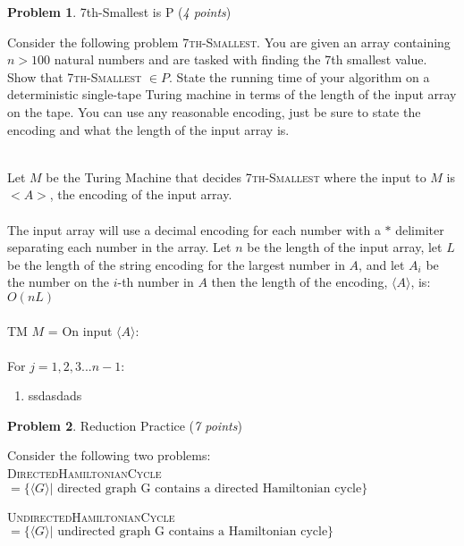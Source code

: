 \documentclass[11pt]{article}
\theoremstyle{definition}
\theoremstyle{theorem}
\newtheorem{prob}{Problem}
\newcommand{\solution}{\medskip\noindent{\color{blue}\textbf{Solution:}}}
\begin{document}
\newpage

\begin{prob} 7th-Smallest is P (\emph{4 points})\end{prob}

Consider the following problem \textsc{7th-Smallest}. You are given an array containing $n>100$ natural numbers and are tasked with finding the 7th smallest value. Show that \textsc{7th-Smallest} $\in P$. State the running time of your algorithm on a deterministic single-tape Turing machine in terms of the length of the input array on the tape. You can use any reasonable encoding, just be sure to state the encoding and what the length of the input array is.

\solution\\
Let $M$ be the Turing Machine that decides \textsc{7th-Smallest} where the input to $M$ is $<A>$, the encoding of the input array. \\~\\
The input array will use a decimal encoding for each number with a $*$ delimiter separating each number in the array. Let $n$ be the length of the input array, let $L$ be the length of the string encoding for the largest number in $A$, and let $A_i$ be the number on the $i$-th number in $A$ then the length of the encoding, $\langle A \rangle$, is: \\
$O(nL)$ \\~\\
TM $M$ = On input $\langle A \rangle$: \\~\\
\indent For $j = 1, 2, 3 ... n - 1$:
\begin{enumerate}[leftmargin=.75cm]
\item ssdasdads
\end{enumerate}


\newpage

\begin{prob} Reduction Practice (\emph{7 points})\end{prob}

Consider the following two problems:\\

\textsc{DirectedHamiltonianCycle} $= \{ \langle G \rangle | \text{ directed graph G contains a directed Hamiltonian cycle} \}$

\textsc{UndirectedHamiltonianCycle} $= \{ \langle G \rangle | \text{ undirected graph G contains a Hamiltonian cycle} \}$\\
\end{document}
